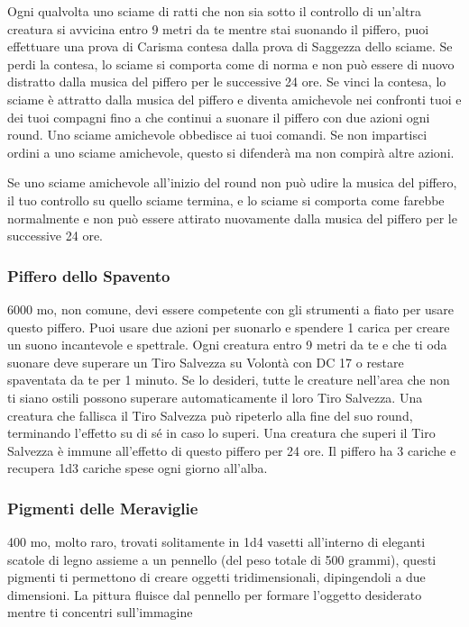 \begin{multicols}{2}
Ogni qualvolta uno sciame di ratti che non sia sotto il controllo di un'altra creatura si avvicina entro 9 metri da te mentre stai suonando il piffero, puoi effettuare una prova di Carisma contesa dalla prova di Saggezza dello sciame. Se perdi la contesa, lo sciame si comporta come di norma e non può essere di nuovo distratto dalla musica del piffero per le successive 24 ore. Se vinci la contesa, lo sciame è attratto dalla musica del piffero e diventa amichevole nei confronti tuoi e dei tuoi compagni fino a che continui a suonare il piffero con due azioni ogni round. Uno sciame amichevole obbedisce ai tuoi comandi. Se non impartisci ordini a uno sciame amichevole, questo si difenderà ma non compirà altre azioni.

Se uno sciame amichevole all'inizio del round non può udire la musica del piffero, il tuo controllo su quello sciame termina, e lo sciame si comporta come farebbe normalmente e non può essere attirato nuovamente dalla musica del piffero per le successive 24 ore.

\subsubsection*{Piffero dello Spavento}
6000 mo, non comune, devi essere competente con gli strumenti a fiato per usare questo piffero. Puoi usare due azioni per suonarlo e spendere 1 carica per creare un suono incantevole e spettrale. Ogni creatura entro 9 metri da te e che ti oda suonare deve superare un Tiro Salvezza su Volontà con DC 17 o restare spaventata da te per 1 minuto. Se lo desideri, tutte le creature nell'area che non ti siano ostili possono superare automaticamente il loro Tiro Salvezza. Una creatura che fallisca il Tiro Salvezza può ripeterlo alla fine del suo round, terminando l'effetto su di sé in caso lo superi. Una creatura che superi il Tiro Salvezza è immune all'effetto di questo piffero per 24 ore. Il piffero ha 3 cariche e recupera 1d3 cariche spese ogni giorno all'alba.

\subsubsection*{Pigmenti delle Meraviglie}
400 mo, molto raro, trovati solitamente in 1d4 vasetti all'interno di eleganti scatole di legno assieme a un pennello (del peso totale di 500 grammi), questi pigmenti ti permettono di creare oggetti tridimensionali, dipingendoli a due dimensioni. La pittura fluisce dal pennello per formare l'oggetto desiderato mentre ti concentri sull'immagine


\end{multicols}
